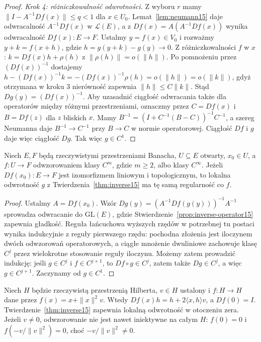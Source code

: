 \begin{proof}
\emph{Krok 4: różniczkowalność odwrotności.} Z wyboru $r$ mamy $\|I-A^{-1}Df(x)\|\le q<1$ dla $x\in U_0$. Lemat~\ref{lem:neumann15} daje odwracalność $A^{-1}Df(x)$ w $\mathcal L(E)$, a z $Df(x)=A(A^{-1}Df(x))$ wynika odwracalność $Df(x):E\to F$. Ustalmy $y=f(x)\in V_0$ i rozważmy $y+k=f(x+h)$, gdzie $h=g(y+k)-g(y)\to0$. Z różniczkowalności $f$ w $x$:
$k=Df(x)h+\rho(h)$ z $\|\rho(h)\|=o(\|h\|)$. Po pomnożeniu przez $(Df(x))^{-1}$ dostajemy
$h-(Df(x))^{-1}k=-(Df(x))^{-1}\rho(h)=o(\|h\|)=o(\|k\|)$,
gdyż otrzymana w kroku 3 nierówność zapewnia $\|h\|\le C\|k\|$. Stąd $Dg(y)=(Df(x))^{-1}$. Aby uzasadnić ciągłość odwracania także dla operatorów między różnymi przestrzeniami, oznaczmy przez $C=Df(x)$ i $B=Df(z)$ dla $z$ bliskich $x$. Mamy $B^{-1}=(I+C^{-1}(B-C))^{-1}C^{-1}$, a szereg Neumanna daje $B^{-1}\to C^{-1}$ przy $B\to C$ w normie operatorowej. Ciągłość $Df$ i $g$ daje więc ciągłość $Dg$. Tak więc $g\in C^1$.
\end{proof}

\begin{wniosek}[Wersja $C^m$]
\label{cor:inverse-ck15}
Niech $E,F$ będą rzeczywistymi przestrzeniami Banacha, $U\subseteq E$ otwarty, $x_0\in U$, a $f:U\to F$ odwzorowaniem klasy $C^m$, gdzie $m\ge2$, albo klasy $C^\infty$. Jeżeli $Df(x_0):E\to F$ jest izomorfizmem liniowym i topologicznym, to lokalna odwrotność $g$ z Twierdzenia~\ref{thm:inverse15} ma tę samą regularność co $f$.
\end{wniosek}
\begin{proof}
Ustalmy $A=Df(x_0)$. Wzór $Dg(y)=(A^{-1}Df(g(y)))^{-1}A^{-1}$ sprowadza odwracanie do $\mathrm{GL}(E)$, gdzie Stwierdzenie~\ref{prop:inverse-operator15} zapewnia gładkość. Reguła łańcuchowa wyższych rzędów w potrzebnej tu postaci wynika indukcyjnie z reguły pierwszego rzędu: pochodna złożenia jest iloczynem dwóch odwzorowań operatorowych, a ciągłe mnożenie dwuliniowe zachowuje klasę $C^j$ przez wielokrotne stosowanie reguły iloczynu. Możemy zatem prowadzić indukcję: jeśli $g\in C^j$ i $f\in C^{j+1}$, to $Df\circ g\in C^j$, zatem także $Dg\in C^j$, a więc $g\in C^{j+1}$. Zaczynamy od $g\in C^1$.
\end{proof}

\begin{przyklad}
\label{ex:inverse-hilbert15}
Niech $H$ będzie rzeczywistą przestrzenią Hilberta, $v\in H$ ustalony i $f:H\to H$ dane przez $f(x)=x+\|x\|^2v$. Wtedy $Df(x)h=h+2\langle x,h\rangle v$, a $Df(0)=I$. Twierdzenie~\ref{thm:inverse15} zapewnia lokalną odwrotność w otoczeniu zera. Jeżeli $v\ne0$, odwzorowanie nie jest nawet iniektywne na całym $H$: $f(0)=0$ i $f(-v/\|v\|^2)=0$, choć $-v/\|v\|^2\ne0$.
\end{przyklad}

